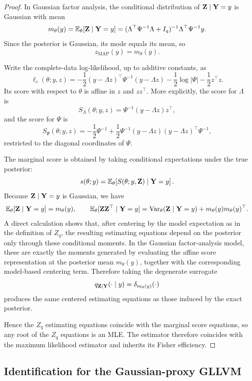 \documentclass[twoside,11pt]{article}
\newcommand{\Var}{\operatorname{Var}}
\begin{document}
\begin{proof}
In Gaussian factor analysis, the conditional distribution of \({\bf Z}\mid {\bf Y}=y\) is Gaussian with mean
\[
m_\theta(y)
=
\mathbb{E}_\theta[{\bf Z}\mid {\bf Y}=y]
=
(\Lambda^\top\Psi^{-1}\Lambda+I_q)^{-1}\Lambda^\top\Psi^{-1}y.
\]
Since the posterior is Gaussian, its mode equals its mean, so
\[
z_{\mathrm{MAP}}(y)=m_\theta(y).
\]

Write the complete-data log-likelihood, up to additive constants, as
\[
\ell_c(\theta;y,z)
=
-\frac12 (y-\Lambda z)^\top \Psi^{-1}(y-\Lambda z)
-\frac12 \log |\Psi|
-\frac12 z^\top z.
\]
Its score with respect to \(\theta\) is affine in \(z\) and \(zz^\top\). More explicitly, the score for \(\Lambda\) is
\[
S_\Lambda(\theta;y,z)
=
\Psi^{-1}(y-\Lambda z)z^\top,
\]
and the score for \(\Psi\) is
\[
S_\Psi(\theta;y,z)
=
-\frac12 \Psi^{-1}
+\frac12 \Psi^{-1}(y-\Lambda z)(y-\Lambda z)^\top \Psi^{-1},
\]
restricted to the diagonal coordinates of \(\Psi\).

The marginal score is obtained by taking conditional expectations under the true posterior:
\[
s(\theta;y)
=
\mathbb{E}_\theta\!\left[S(\theta;y,{\bf Z})\mid {\bf Y}=y\right].
\]
Because \({\bf Z}\mid {\bf Y}=y\) is Gaussian, we have
\[
\E_\theta[\Z\mid \Y=y]=m_\theta(y),
\qquad
\E_\theta[\Z\Z^\top\mid \Y=y]
=
\Var_\theta(\Z\mid \Y=y)+m_\theta(y)m_\theta(y)^\top.
\]
A direct calculation shows that, after centering by the model expectation as in the definition of \(Z_q\), the resulting estimating equations depend on the posterior only through these conditional moments. In the Gaussian factor-analysis model, these are exactly the moments generated by evaluating the affine score representation at the posterior mean \(m_\theta(y)\), together with the corresponding model-based centering term. Therefore taking the degenerate surrogate
\[
q_{{\bf Z}\mid{\bf Y}}(\cdot\mid y)=\delta_{m_\theta(y)}(\cdot)
\]
produces the same centered estimating equations as those induced by the exact posterior.

Hence the \(Z_q\) estimating equations coincide with the marginal score equations, so any root of the \(Z_q\) equations is an MLE. The estimator therefore coincides with the maximum likelihood estimator and inherits its Fisher efficiency.
\end{proof}


\subsection{Identification for the Gaussian-proxy GLLVM}
\label{apx:gllvm-identification}
\end{document}
